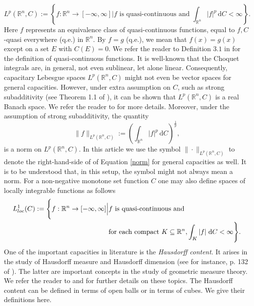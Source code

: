 \documentclass{amsart}
\numberwithin{theorem}{section}
\numberwithin{equation}{section}
\begin{document}
		\begin{equation}
			L^p(\mathbb{R}^n,C) := \left\{f: \mathbb{R}^n \to [-\infty,\infty] \Big| f \text{ is quasi-continuous and }\int_{\mathbb{R}^n} |f|^p\,\mathrm{d}C < \infty \right\}.
		\end{equation} 
		Here $f$ represents an equivalence class of quasi-continuous functions, equal to $f, C$-quasi everywhere (q.e.) in $\mathbb{R}^n$. By $f=g$ (q.e.), we mean that  $f(x) = g(x)$ except on a set $E$ with $C(E) = 0$. We refer the reader to  Definition $3.1$ in \cite{PonceSpector} for the definition of quasi-continuous functions. It is well-known that the Choquet integrals are, in general, not even sublinear, let alone linear. Consequently, capacitary Lebesgue spaces $L^p(\mathbb{R}^n,C)$ might not even be vector spaces for general capacities. However, under extra assumption on $C$, such as strong subadditivity (see Theorem 1.1 of \cite{PonceSpector}), it can be shown that $L^p(\mathbb{R}^n,C)$ is a real Banach space. We refer the reader to \cite{PonceSpector} for more details. Moreover, under the assumption of strong subadditivity, the quantity 
		\begin{equation}\label{norm}
			\|f\|_{L^p(\mathbb{R}^n,C)} := \left( \int_{\mathbb{R}^n}^{}|f|^p\,\mathrm{d}C \right)^\frac{1}{p},
		\end{equation}
		is a norm on $L^p(\mathbb{R}^n,C)$. In this article we use the symbol  $\|\cdot\|_{L^p(\mathbb{R}^n,C)}$ to denote the right-hand-side of of Equation \eqref{norm} for general capacities as well. It is to be understood that, in this setup, the symbol might not always mean a norm. For a non-negative monotone set function $C$ one may also define spaces of locally integrable functions as follows
		\begin{equation}
			\begin{aligned}
				L_{loc}^1(C) : = \Bigg\{ f: \mathbb{R}^n \to [-\infty,\infty] \Big| &f \text{ is quasi-continuous and} \\
				&\text{for each compact }K \subseteq \mathbb{R}^n, \int_{K}^{}|f|\hspace{0.1cm}\mathrm{d}C < \infty \Bigg\}.
			\end{aligned}
		\end{equation}
		One of the important capacities in literature is the \textit{Hausdorff content}. It arises in the study of Hausdorff measure and Hausdorff dimension (see for instance, p. 132 of \cite{Adams}). The latter are important concepts in the study of geometric measure theory. We refer the reader to \cite{Mattila1} and \cite{Mattila2} for further details on these topics. The Hausdorff content can be defined in terms of open balls or in terms of cubes. We give their definitions here.
\end{document}
